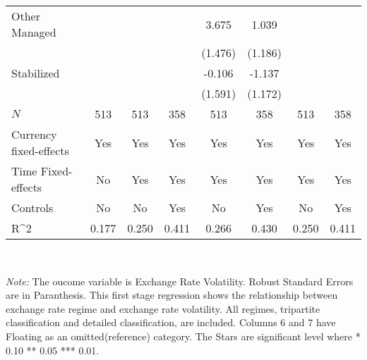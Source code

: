 \begin{table}[H]
\begin{adjustbox}{max width=\textwidth}
\begin{tabular}{l*{7}{c}}
\addlinespace
Other Managed&                     &                     &                     &       3.675\sym{**} &       1.039         &                     &                     \\
            &                     &                     &                     &     (1.476)         &     (1.186)         &                     &                     \\
\addlinespace
Stabilized  &                     &                     &                     &      -0.106         &      -1.137         &                     &                     \\
            &                     &                     &                     &     (1.591)         &     (1.172)         &                     &                     \\
\midrule
\(N\)       &         513         &         513         &         358         &         513         &         358         &         513         &         358         \\
Currency fixed-effects&         Yes         &         Yes         &         Yes         &         Yes         &         Yes         &         Yes         &         Yes         \\
Time Fixed-effects&          No         &         Yes         &         Yes         &         Yes         &         Yes         &         Yes         &         Yes         \\
Controls    &          No         &          No         &         Yes         &          No         &         Yes         &          No         &         Yes         \\
R^{2}       &       0.177         &       0.250         &       0.411         &       0.266         &       0.430         &       0.250         &       0.411         \\
\bottomrule
\end{tabular}
\end{adjustbox}
\\
\footnotesize
\item
\textit{Note:}
The oucome variable is Exchange Rate Volatility. Robust Standard Errors are in Paranthesis. This first stage regression shows the relationship between exchange rate regime and exchange rate volatility. All regimes, tripartite classification and detailed classification, are included. Columns 6 and 7 have Floating as an omitted(reference) category. The Stars are significant level where * 0.10 ** 0.05 *** 0.01.
\end{table}
